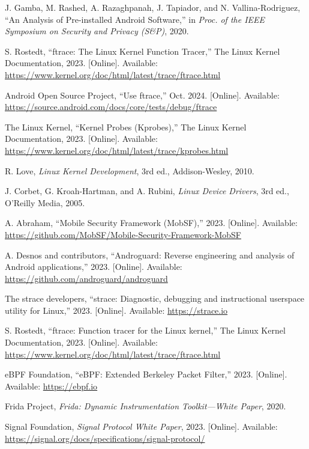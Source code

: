 \documentclass[a4paper,12pt]{report}
\begin{document}
\begin{thebibliography}{99}
J. Gamba, M. Rashed, A. Razaghpanah, J. Tapiador, and N. Vallina-Rodriguez, “An Analysis of Pre-installed Android Software,” in \emph{Proc. of the IEEE Symposium on Security and Privacy (S\&P)}, 2020.

S. Rostedt, “ftrace: The Linux Kernel Function Tracer,” The Linux Kernel Documentation, 2023. [Online]. Available: \url{https://www.kernel.org/doc/html/latest/trace/ftrace.html}

Android Open Source Project, “Use ftrace,” Oct. 2024. [Online]. Available: \url{https://source.android.com/docs/core/tests/debug/ftrace}

The Linux Kernel, “Kernel Probes (Kprobes),” The Linux Kernel Documentation, 2023. [Online]. Available: \url{https://www.kernel.org/doc/html/latest/trace/kprobes.html}

R. Love, \emph{Linux Kernel Development}, 3rd ed., Addison-Wesley, 2010.

J. Corbet, G. Kroah-Hartman, and A. Rubini, \emph{Linux Device Drivers}, 3rd ed., O'Reilly Media, 2005.

A. Abraham, “Mobile Security Framework (MobSF),” 2023. [Online]. Available: \url{https://github.com/MobSF/Mobile-Security-Framework-MobSF}

A. Desnos and contributors, “Androguard: Reverse engineering and analysis of Android applications,” 2023. [Online]. Available: \url{https://github.com/androguard/androguard}

The strace developers, “strace: Diagnostic, debugging and instructional userspace utility for Linux,” 2023. [Online]. Available: \url{https://strace.io}

S. Rostedt, “ftrace: Function tracer for the Linux kernel,” The Linux Kernel Documentation, 2023. [Online]. Available: \url{https://www.kernel.org/doc/html/latest/trace/ftrace.html}

eBPF Foundation, “eBPF: Extended Berkeley Packet Filter,” 2023. [Online]. Available: \url{https://ebpf.io}

Frida Project, \emph{Frida: Dynamic Instrumentation Toolkit—White Paper}, 2020.

Signal Foundation, \emph{Signal Protocol White Paper}, 2023. [Online]. Available: \url{https://signal.org/docs/specifications/signal-protocol/}


\end{thebibliography}
\end{document}
